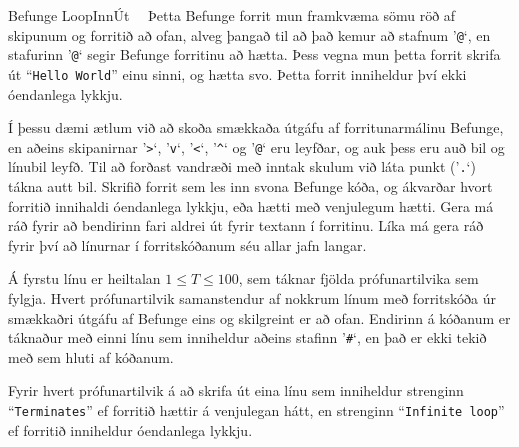 \begin{problem}{Befunge Loop}{Inn}{Út}{~}{~}
	Þetta Befunge forrit mun framkvæma sömu röð af skipunum og forritið að ofan, alveg þangað til að það kemur að stafnum '\texttt{@}`, en stafurinn '\texttt{@}` segir Befunge forritinu að hætta. Þess vegna mun þetta forrit skrifa út "`\texttt{Hello World}"' einu sinni, og hætta svo. Þetta forrit inniheldur því ekki óendanlega lykkju.

	Í þessu dæmi ætlum við að skoða smækkaða útgáfu af forritunarmálinu Befunge, en aðeins skipanirnar '\texttt{>}`, '\texttt{v}`, '\texttt{<}`, '\texttt{\^{}}` og '\texttt{@}` eru leyfðar, og auk þess eru auð bil og línubil leyfð. Til að forðast vandræði með inntak skulum við láta punkt ('\texttt{.}`) tákna autt bil. Skrifið forrit sem les inn svona Befunge kóða, og ákvarðar hvort forritið innihaldi óendanlega lykkju, eða hætti með venjulegum hætti. Gera má ráð fyrir að bendirinn fari aldrei út fyrir textann í forritinu. Líka má gera ráð fyrir því að línurnar í forritskóðanum séu allar jafn langar.

	\Input

		Á fyrstu línu er heiltalan $1 \leq T \leq 100$, sem táknar fjölda prófunartilvika sem fylgja. Hvert prófunartilvik samanstendur af nokkrum línum með forritskóða úr smækkaðri útgáfu af Befunge eins og skilgreint er að ofan. Endirinn á kóðanum er táknaður með einni línu sem inniheldur aðeins stafinn '\texttt{\#{}}`, en það er ekki tekið með sem hluti af kóðanum.

	\Output

		Fyrir hvert prófunartilvik á að skrifa út eina línu sem inniheldur strenginn "`\texttt{Terminates}"' ef forritið hættir á venjulegan hátt, en strenginn "`\texttt{Infinite loop}"' ef forritið inniheldur óendanlega lykkju.

	\Examples



\end{problem}
